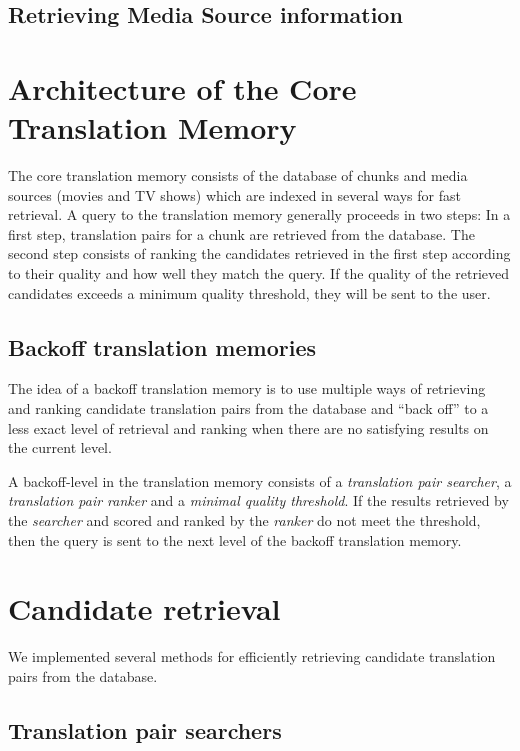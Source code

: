 \subsection{Retrieving Media Source information}
\newpage




\section{Architecture of the Core Translation Memory}

The core translation memory consists of the database of chunks and media
sources (movies and TV shows) which are indexed in several ways for fast
retrieval. A query to the translation memory generally proceeds in two
steps: In a first step, translation pairs for a chunk are retrieved from
the database. The second step consists of ranking the candidates
retrieved in the first step according to their quality and how well they
match the query. If the quality of the retrieved candidates exceeds a
minimum quality threshold, they will be sent to the user.

\subsection{Backoff translation memories}

The idea of a backoff translation memory is to use multiple ways of
retrieving and ranking candidate translation pairs from the database and
``back off'' to a less exact level of retrieval and ranking when there
are no satisfying results on the current level.

A backoff-level in the translation memory consists of a \emph{translation pair
searcher}, a \emph{translation pair ranker} and a \emph{minimal quality
threshold}. 
If the results retrieved by the \emph{searcher} and scored and ranked by
the \emph{ranker} do not meet the threshold, then the query is sent to the 
next level of the backoff translation memory. 


\section{Candidate retrieval}
\label{sec:candidate_retrieval}

We implemented several methods for efficiently retrieving candidate
translation pairs from the database. 


\subsection{Translation pair searchers}

